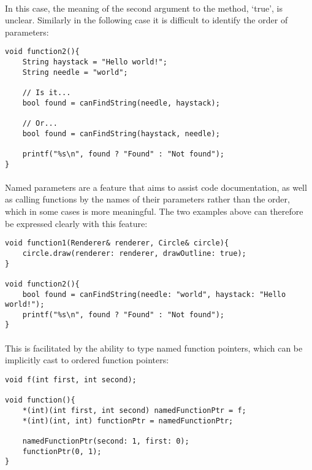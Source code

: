 \documentclass[12pt,twoside,notitlepage]{report}
\begin{document}
\paragraph{}
In this case, the meaning of the second argument to the method, `true', is unclear. Similarly in the following case it is difficult to identify the order of parameters:

\small{
\begin{verbatim}
void function2(){
    String haystack = "Hello world!";
    String needle = "world";
    
    // Is it...
    bool found = canFindString(needle, haystack);
    
    // Or...
    bool found = canFindString(haystack, needle);
    
    printf("%s\n", found ? "Found" : "Not found");
}
\end{verbatim}
}

\paragraph{}
Named parameters are a feature that aims to assist code documentation, as well as calling functions by the names of their parameters rather than the order, which in some cases is more meaningful. The two examples above can therefore be expressed clearly with this feature:

\small{
\begin{verbatim}
void function1(Renderer& renderer, Circle& circle){
    circle.draw(renderer: renderer, drawOutline: true);
}

void function2(){
    bool found = canFindString(needle: "world", haystack: "Hello world!");
    printf("%s\n", found ? "Found" : "Not found");
}
\end{verbatim}
}

\paragraph{}
This is facilitated by the ability to type named function pointers, which can be implicitly cast to ordered function pointers:

\small{
\begin{verbatim}
void f(int first, int second);

void function(){
    *(int)(int first, int second) namedFunctionPtr = f;
    *(int)(int, int) functionPtr = namedFunctionPtr;
    
    namedFunctionPtr(second: 1, first: 0);
    functionPtr(0, 1);
}
\end{verbatim}
}
\end{document}
